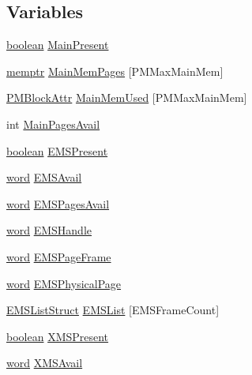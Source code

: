 \subsection*{Variables}
\begin{DoxyCompactItemize}
\item 
\hyperlink{ID__HEAD_8H_a7c6368b321bd9acd0149b030bb8275ed}{boolean} \hyperlink{ID__PM_8C_a023d72d7c20dc97648a2403f2e3ae0dc}{MainPresent}
\item 
\hyperlink{ID__MM_8H_a04062decc7eb282b066c65e9137bb9bf}{memptr} \hyperlink{ID__PM_8C_a2a4448d32405a8771e6cdbc9111eec4f}{MainMemPages} \mbox{[}PMMaxMainMem\mbox{]}
\item 
\hyperlink{ID__PM_8H_a061921eacd832e8d25698aed67818b5b}{PMBlockAttr} \hyperlink{ID__PM_8C_ac948cb22aa3829c8a38da5f20c30b9cb}{MainMemUsed} \mbox{[}PMMaxMainMem\mbox{]}
\item 
int \hyperlink{ID__PM_8C_aea208d1585f4e840a3bd9f2dc79febdb}{MainPagesAvail}
\item 
\hyperlink{ID__HEAD_8H_a7c6368b321bd9acd0149b030bb8275ed}{boolean} \hyperlink{ID__PM_8C_ab35be0811b0150bb1a52eaad6d3d6340}{EMSPresent}
\item 
\hyperlink{ID__HEAD_8H_abad51e07ab6d26bec9f1f786c8d65bcd}{word} \hyperlink{ID__PM_8C_a070c70008059f6ed164c4baa34d84f2a}{EMSAvail}
\item 
\hyperlink{ID__HEAD_8H_abad51e07ab6d26bec9f1f786c8d65bcd}{word} \hyperlink{ID__PM_8C_a0b3caaa008ec8ab4b8486880a825bad0}{EMSPagesAvail}
\item 
\hyperlink{ID__HEAD_8H_abad51e07ab6d26bec9f1f786c8d65bcd}{word} \hyperlink{ID__PM_8C_a99b4bb7b9ffe9727ddd4bd4d7a586e0a}{EMSHandle}
\item 
\hyperlink{ID__HEAD_8H_abad51e07ab6d26bec9f1f786c8d65bcd}{word} \hyperlink{ID__PM_8C_a41433c74e5213d6e6dc1fe8713688c3a}{EMSPageFrame}
\item 
\hyperlink{ID__HEAD_8H_abad51e07ab6d26bec9f1f786c8d65bcd}{word} \hyperlink{ID__PM_8C_ab76b57d416cd9763e7ea45974bf6ee0d}{EMSPhysicalPage}
\item 
\hyperlink{structEMSListStruct}{EMSListStruct} \hyperlink{ID__PM_8C_a045a2fcf98833b9fee5b21fa2de99e73}{EMSList} \mbox{[}EMSFrameCount\mbox{]}
\item 
\hyperlink{ID__HEAD_8H_a7c6368b321bd9acd0149b030bb8275ed}{boolean} \hyperlink{ID__PM_8C_a5f57a31d9e6a665cbebbb452d757de61}{XMSPresent}
\item 
\hyperlink{ID__HEAD_8H_abad51e07ab6d26bec9f1f786c8d65bcd}{word} \hyperlink{ID__PM_8C_afa7725d210182d66b1cbf507e491cf3f}{XMSAvail}

\end{DoxyCompactItemize}
